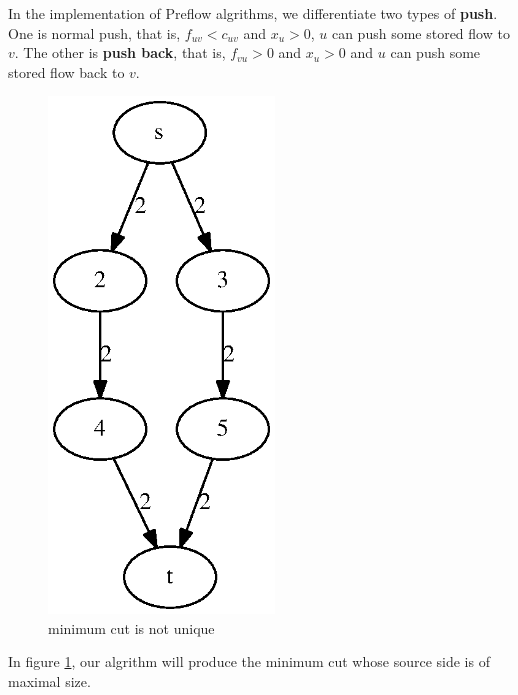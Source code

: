 \documentclass{article}
\begin{document}
In the implementation of Preflow algrithms, we differentiate
two types of \textbf{push}. One is normal push, that is,
$f_{uv} < c_{uv}$ and $x_u >0$, $u$ can push some stored flow
to $v$. The other is \textbf{push back}, that is,
$f_{vu} >0$ and $x_u >0$ and $u$ can push some stored flow back to $v$.

\begin{figure}[!ht]
\centering
\includegraphics[width=6cm]{size.eps}
\caption{minimum cut is not unique}\label{fig:mc}
\end{figure}

In figure \ref{fig:mc}, our algrithm will produce the minimum cut whose source side is of maximal size.
\end{document}
